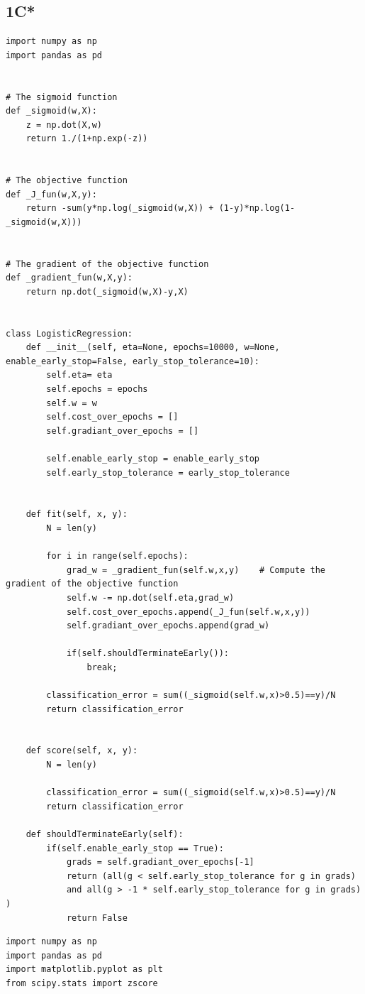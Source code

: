 \documentclass[12pt]{article}
\begin{document}
\begin{flushleft}
		\subsection*{1C*}
		
		\begin{lstlisting}
import numpy as np 
import pandas as pd


# The sigmoid function
def _sigmoid(w,X):
	z = np.dot(X,w)
	return 1./(1+np.exp(-z))


# The objective function
def _J_fun(w,X,y):
	return -sum(y*np.log(_sigmoid(w,X)) + (1-y)*np.log(1-_sigmoid(w,X)))


# The gradient of the objective function
def _gradient_fun(w,X,y):
	return np.dot(_sigmoid(w,X)-y,X)


class LogisticRegression:
	def __init__(self, eta=None, epochs=10000, w=None, enable_early_stop=False, early_stop_tolerance=10):
		self.eta= eta
		self.epochs = epochs
		self.w = w
		self.cost_over_epochs = []
		self.gradiant_over_epochs = []
		
		self.enable_early_stop = enable_early_stop
		self.early_stop_tolerance = early_stop_tolerance
	
	
	def fit(self, x, y):
		N = len(y)
		
		for i in range(self.epochs):
			grad_w = _gradient_fun(self.w,x,y)    # Compute the gradient of the objective function
			self.w -= np.dot(self.eta,grad_w)
			self.cost_over_epochs.append(_J_fun(self.w,x,y))
			self.gradiant_over_epochs.append(grad_w)
			
			if(self.shouldTerminateEarly()):
				break;
	
		classification_error = sum((_sigmoid(self.w,x)>0.5)==y)/N
		return classification_error
	
	
	def score(self, x, y):
		N = len(y)
		
		classification_error = sum((_sigmoid(self.w,x)>0.5)==y)/N
		return classification_error
	
	def shouldTerminateEarly(self):
		if(self.enable_early_stop == True):
			grads = self.gradiant_over_epochs[-1]
			return (all(g < self.early_stop_tolerance for g in grads)
			and all(g > -1 * self.early_stop_tolerance for g in grads) )
			return False

		\end{lstlisting}
		
		\begin{lstlisting}
import numpy as np 
import pandas as pd
import matplotlib.pyplot as plt
from scipy.stats import zscore


\end{lstlisting}
\end{flushleft}
\end{document}
